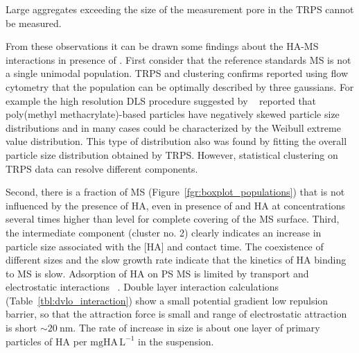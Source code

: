 \documentclass[journal=langd5,manuscript=article]{achemso}
\begin{document}
Large aggregates exceeding  the size of 
the measurement pore in the TRPS cannot be measured.


From these observations it can be drawn some findings  about the HA-MS interactions in presence of .
First consider that the reference standards MS is not a single unimodal population.
TRPS and clustering confirms reported using flow cytometry that the population can be optimally described by three gaussians.
 For example the  high resolution DLS procedure suggested by
 ~\citeauthor{Bryant2003AccurateSuspensions}\cite{Bryant2003AccurateSuspensions} 
reported  that poly(methyl methacrylate)-based particles have negatively
skewed particle size distributions and in many cases could be characterized
by the Weibull extreme value distribution. This type of distribution also
was found by fitting the overall particle size distribution obtained by TRPS. However, statistical clustering on TRPS data can resolve different components.


Second, there is a fraction of MS (Figure~\ref{fgr:boxplot_populations})
that is not influenced by the presence of HA, even in presence of 
and HA at concentrations several times higher than level for complete
covering of the MS surface.
Third, the intermediate component (cluster no. 2) clearly indicates  an
increase in particle size associated with the [HA] and
contact time. The coexistence of different sizes and the
slow  growth rate indicate that the kinetics of HA binding
to MS is slow. Adsorption of HA on PS MS is limited by
transport and electrostatic interactions~ \cite{doi:10.1021/es981236u}.
Double layer interaction calculations (Table~\ref{tbl:dvlo_interaction}) show a small potential gradient  low  repulsion barrier,
so that the attraction force  is small  and range of electrostatic attraction is short $\sim 20~\mathrm{nm}$.
The rate of increase in size is about one  layer of primary particles of HA per $\mathrm{mg HA\,L^{-1}}$ in the suspension.
\end{document}
